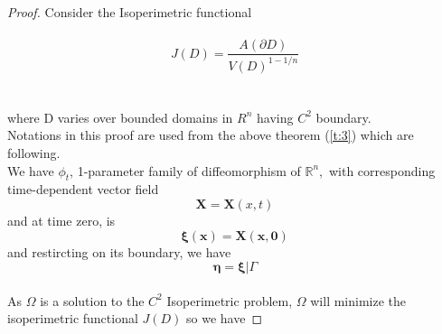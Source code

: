 \documentclass[oneside]{book}
\begin{document}
\begin{proof}

Consider the Isoperimetric functional \\\\
\begin{equation}
\label{eq35}
J(D)=\frac{A(\partial D)}{V(D)^{1-1 / n}}
 \end{equation}
 \\\\
where D varies over bounded domains in $R^{n}$ having $C^{2}$ boundary.\\
Notations in this proof are used from the above theorem (\ref{t:3}) which are \\
following.
\\ 
We have $\phi_{t}$, 1-parameter family of diffeomorphism of $\mathbb{R}^{n},$ with corresponding time-dependent vector field $$\boldsymbol{X} = \boldsymbol{X}(x, t)$$ and at time zero,  is \\ $$\boldsymbol{\xi}(\boldsymbol{x})=\boldsymbol{X}(\boldsymbol{x}, \boldsymbol{0})$$ and  restircting \boldsymbol{\xi} on its boundary, we have
\\      $$\boldsymbol{\eta}=\boldsymbol{\xi} | \Gamma $$ \\
As $\Omega$ is a solution to the  $C^{2}$ Isoperimetric problem, $\Omega$ will minimize the isoperimetric functional $J(D)$ so we have



\end{proof}
\end{document}
